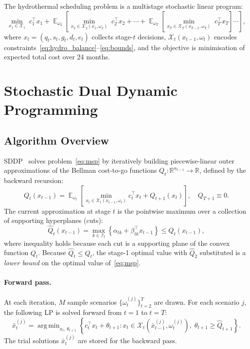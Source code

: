 \documentclass[11pt,letterpaper]{article}
\DeclareMathOperator{\E}{\mathbb{E}}
\DeclareMathOperator{\argmin}{arg\,min}
\newcommand{\R}{\mathbb{R}}
\begin{document}
The hydrothermal scheduling problem is a multistage stochastic linear program:
\begin{equation}
  \min_{x_1 \in \mathcal{X}_1}\; c_1^\top x_1 +
  \E_{\omega_2}\!\left[\min_{x_2 \in \mathcal{X}_2(x_1,\omega_2)}\; c_2^\top x_2 +
  \cdots +
  \E_{\omega_T}\!\left[\min_{x_T \in \mathcal{X}_T(x_{T-1},\omega_T)}\; c_T^\top x_T
  \right]\cdots\right],
  \label{eq:msp}
\end{equation}
where $x_t = (q_t, s_t, g_t, d_t, e_t)$ collects stage-$t$ decisions,
$\mathcal{X}_t(x_{t-1},\omega_t)$ encodes constraints~\eqref{eq:hydro_balance}--\eqref{eq:bounds},
and the objective is minimisation of expected total cost over 24 months.

\section{Stochastic Dual Dynamic Programming}
\label{sec:sddp}

\subsection{Algorithm Overview}

SDDP~\citep{pereira1991} solves problem~\eqref{eq:msp} by iteratively building
piecewise-linear outer approximations of the Bellman cost-to-go functions
$Q_t : \R^{n_{t-1}} \to \R$, defined by the backward recursion:
\begin{equation}
  Q_t(x_{t-1}) = \E_{\omega_t}\!\left[
  \min_{x_t \in \mathcal{X}_t(x_{t-1},\omega_t)} c_t^\top x_t + Q_{t+1}(x_t)
  \right],
  \quad Q_{T+1} \equiv 0.
  \label{eq:bellman}
\end{equation}
The current approximation at stage $t$ is the pointwise maximum over a collection
of supporting hyperplanes (cuts):
\begin{equation}
  \hat{Q}_t(x_{t-1}) = \max_{k \in \mathcal{I}_t}
  \left\{\alpha_{tk} + \beta_{tk}^\top x_{t-1}\right\} \le Q_t(x_{t-1}),
  \label{eq:cut_approx}
\end{equation}
where inequality holds because each cut is a supporting plane of the convex
function $Q_t$.  Because $\hat{Q}_t \le Q_t$, the stage-1 optimal value with
$\hat{Q}_2$ substituted is a \emph{lower bound} on the optimal value
of~\eqref{eq:msp}.

\paragraph{Forward pass.}
At each iteration, $M$ sample scenarios $\{\omega_t^{(j)}\}_{t=2}^T$ are drawn.
For each scenario $j$, the following LP is solved forward from $t=1$ to $t=T$:
\begin{equation}
  \bar{x}_t^{(j)} = \argmin_{x_t,\,\theta_{t+1}}
  \left\{c_t^\top x_t + \theta_{t+1} :
  x_t \in \mathcal{X}_t(\bar{x}_{t-1}^{(j)},\omega_t^{(j)}),\;
  \theta_{t+1} \ge \hat{Q}_{t+1}\right\}.
  \label{eq:forward_lp}
\end{equation}
The trial solutions $\bar{x}_t^{(j)}$ are stored for the backward pass.
\end{document}
